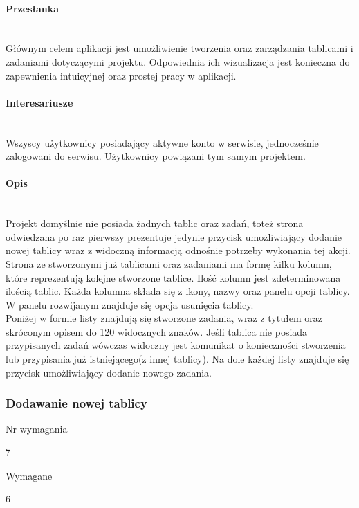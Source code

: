 \documentclass[eng,printmode]{mgr}
\begin{document}
\paragraph{Przesłanka}\ \\
Głównym celem aplikacji jest umożliwienie tworzenia oraz zarządzania tablicami i zadaniami dotyczącymi projektu. Odpowiednia ich wizualizacja jest konieczna do zapewnienia intuicyjnej oraz prostej pracy w aplikacji.

\paragraph{Interesariusze}\ \\
Wszyscy użytkownicy posiadający aktywne konto w serwisie, jednocześnie zalogowani do serwisu. Użytkownicy powiązani tym samym projektem.

\paragraph{Opis}\ \\
Projekt domyślnie nie posiada żadnych tablic oraz zadań, toteż strona odwiedzana po raz pierwszy prezentuje jedynie przycisk umożliwiający dodanie nowej tablicy wraz z widoczną informacją odnośnie potrzeby wykonania tej akcji. \\
Strona ze stworzonymi już tablicami oraz zadaniami ma formę kilku kolumn, które reprezentują kolejne stworzone tablice. Ilość kolumn jest zdeterminowana ilością tablic. Każda kolumna składa się z ikony, nazwy oraz panelu opcji tablicy. W panelu rozwijanym znajduje się opcja usunięcia tablicy. \\
Poniżej w formie listy znajdują się stworzone zadania, wraz z tytułem oraz skróconym opisem do 120 widocznych znaków. Jeśli tablica nie posiada przypisanych zadań wówczas widoczny jest komunikat o konieczności stworzenia lub przypisania już istniejącego(z innej tablicy). Na dole każdej listy znajduje się przycisk umożliwiający dodanie nowego zadania.
\newpage

\subsubsection{Dodawanie nowej tablicy}
\begin{labeling}{Nr wymagania}
\item [Nr wymagania:] 7
\item [Typ:] Wymagane
\item [Powiązania:] 6
\end{labeling}
\end{document}

